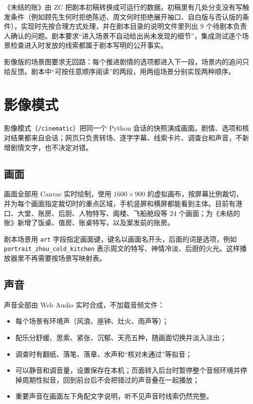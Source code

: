 \documentclass[11pt,a4paper,fontset=mac]{ctexart}
\begin{document}
《未结的账》由 ZC 把剧本初稿转换成可运行的数据。初稿里有几处分支没有写触发条件（例如顾先生何时拒绝陈述、周文何时拒绝展开袖口、自白版与否认版的条件），实现时先按合理方式处理，并在剧本目录的说明文件里列出 9 个待剧本负责人确认的问题。剧本要求“进入场景不自动给出尚未发现的细节”，集成测试逐个场景检查进入时发放的线索都属于剧本写明的公开事实。

影像版的场景图要求无回路：每个推进剧情的选项都进入下一段，场景内的追问只给反馈。剧本中“可按任意顺序阅读”的两段，用两组场景分别实现两种顺序。

\section{影像模式}

影像模式（\texttt{/cinematic}）把同一个 Python 会话的快照演成画面。剧情、选项和核对结果都来自会话；网页只负责转场、逐字字幕、线索卡片、调查台和声音，不新增剧情文字，也不决定对错。

\subsection{画面}

画面全部用 Canvas 实时绘制，使用 $1600\times900$ 的虚拟画布，按屏幕比例裁切，并为每个画面指定裁切时的重点区域，手机竖屏和横屏都能看到主体。目前有港口、大堂、账房、后厨、人物特写、阁楼、飞船舱段等 24 个画面；为《未结的账》新增了饭桌、值房、账桌特写，以及案发前的账房。

剧本场景用 \texttt{art} 字段指定画面键，键名以画面名开头，后面的词是选项，例如 \texttt{portrait\_\allowbreak zhou\_\allowbreak cold\_\allowbreak kitchen} 表示周文的特写、神情冷淡、后厨的火光。这样播放器里不再需要按场景写映射表。

\subsection{声音}

声音全部由 Web Audio 实时合成，不加载音频文件：

\begin{itemize}
  \item 每个场景有环境声（风浪、座钟、灶火、雨声等）；
  \item 配乐分舒缓、思索、紧张、沉郁、天亮五种，随画面切换并淡入淡出；
  \item 调查时有翻纸、落笔、落章、水声和“核对未通过”等拟音；
  \item 可以静音和调音量，设置保存在本机；页面转入后台时暂停整个音频环境并停掉周期性拟音，回到前台后不会把错过的声音叠在一起播放；
  \item 重要声音在画面左下角配文字说明，听不见声音时线索仍然完整。
\end{itemize}
\end{document}
